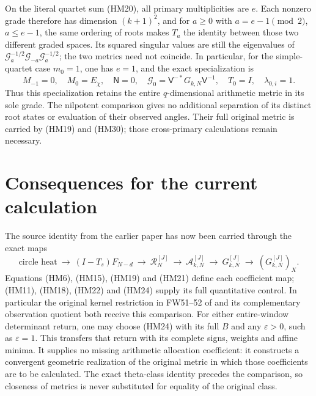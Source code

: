 \documentclass[11pt]{article}
\begin{document}
On the literal quartet sum (HM20), all primary multiplicities are $e$.
Each nonzero grade therefore has dimension $(k+1)^2$, and for $a\ge0$
with $a=e-1\pmod2$, $a\le e-1$, the same ordering of roots makes
$T_a$ the identity between those two different graded spaces. Its
squared singular values are still the eigenvalues of
$\mathcal G_a^{-1/2}\mathcal G_{-a}\mathcal G_a^{-1/2}$; the two
metrics need not coincide. In particular, for the simple-quartet case
$m_0=1$, one has $e=1$, and the exact specialization is
\begin{equation}\tag{HM30}
 M_{-1}=0,\quad M_0=E_\chi,\quad \mathsf N=0,\quad
 \mathcal G_0=\mathsf V^{-*}G_{k,N}\mathsf V^{-1},\quad
 T_0=I,\quad\lambda_{0,i}=1.
\end{equation}
Thus this specialization retains the entire $q$-dimensional arithmetic
metric in its sole grade. The nilpotent comparison gives no additional
separation of its distinct root states or evaluation of their observed
angles. Their full original metric is carried by (HM19) and (HM30);
those cross-primary calculations remain necessary.

\section{Consequences for the current calculation}
The source identity from the earlier paper has now been carried through
the exact maps
\[
 \text{circle heat}\ \longrightarrow\ (I-T_s)F_{N-d}\
 \longrightarrow\ \mathcal R_N^{[J]}\
 \longrightarrow\ \mathcal A_{k,N}^{[J]}\
 \longrightarrow\ G_{k,N}^{[J]}\
 \longrightarrow\ (G_{k,N}^{[J]})_X.
\]
Equations (HM6), (HM15), (HM19) and (HM21) define each coefficient map;
(HM11), (HM18), (HM22) and (HM24) supply its full quantitative control.
In particular the original kernel restriction in FW51--52 of
\cite{hm2:fullwindow} and its complementary observation quotient both
receive this comparison. For either entire-window determinant return,
one may choose (HM24) with its full $B$ and any $\varepsilon>0$, such
as $\varepsilon=1$. This transfers that return with its complete signs,
weights and affine minima. It supplies no missing arithmetic allocation
coefficient: it constructs a convergent geometric realization of the
original metric in which those coefficients are to be calculated.
The exact theta-class identity precedes the comparison, so closeness of
metrics is never substituted for equality of the original class.
\end{document}
